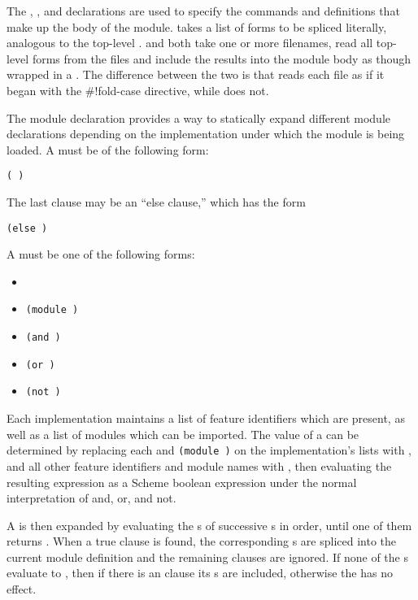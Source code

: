 The , , and  declarations are
used to specify the commands and definitions that make up the body of
the module.   takes a list of forms to be spliced
literally, analogous to the top-level .   and
 both take one or more filenames, read all top-level
forms from the files and include the results into the module body as
though wrapped in a .
The difference between the two is that  reads each file
as if it began with the {\cf{}\#!fold-case} directive, while 
does not.

The  module declaration provides a way to statically
expand different module declarations depending on the 
implementation under which the module is being loaded.  A
 must be of the following form:

{\tt(  \dotsfoo)}

The last clause may be an ``else clause,'' which has the form

{\tt(else  \dotsfoo)}

A  must be one of the following forms:

\begin{itemize}
\item {\tt{}}
\item {\tt(module )}
\item {\tt(and  \dotsfoo)}
\item {\tt(or  \dotsfoo)}
\item {\tt(not )}
\end{itemize}

Each implementation maintains a list of feature identifiers which are
present, as well as a list of modules which can be imported.  The
value of a  can be determined by replacing
each  and {\tt(module )}
on the implementation's lists with \schtrue, and all other feature
identifiers and module names with \schfalse, then evaluating the
resulting expression as a Scheme boolean expression under the normal
interpretation of {\cf and}, {\cf or}, and {\cf not}.

A  is then expanded by evaluating the
s of successive s
in order, until one of them returns \schtrue.  When a true clause is
found, the corresponding s are spliced into
the current module definition and the remaining clauses are ignored.
If none of the s evaluate to \schtrue, then
if there is an  clause its s are
included, otherwise the  has no effect.

